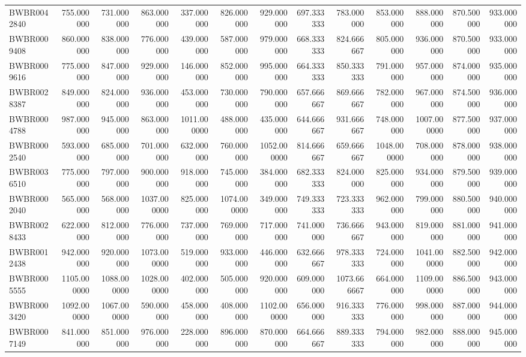 \begin{longtable}{lrrrrrrrrrrrr}
BWBR0042840 & 755.000000 & 731.000000 & 863.000000 & 337.000000 & 826.000000 & 929.000000 & 697.333333 & 783.000000 & 853.000000 & 888.000000 & 870.500000 & 933.000000 \\
BWBR0009408 & 860.000000 & 838.000000 & 776.000000 & 439.000000 & 587.000000 & 979.000000 & 668.333333 & 824.666667 & 805.000000 & 936.000000 & 870.500000 & 933.000000 \\
BWBR0009616 & 775.000000 & 847.000000 & 929.000000 & 146.000000 & 852.000000 & 995.000000 & 664.333333 & 850.333333 & 791.000000 & 957.000000 & 874.000000 & 935.000000 \\
BWBR0028387 & 849.000000 & 824.000000 & 936.000000 & 453.000000 & 730.000000 & 790.000000 & 657.666667 & 869.666667 & 782.000000 & 967.000000 & 874.500000 & 936.000000 \\
BWBR0004788 & 987.000000 & 945.000000 & 863.000000 & 1011.000000 & 488.000000 & 435.000000 & 644.666667 & 931.666667 & 748.000000 & 1007.000000 & 877.500000 & 937.000000 \\
BWBR0002540 & 593.000000 & 685.000000 & 701.000000 & 632.000000 & 760.000000 & 1052.000000 & 814.666667 & 659.666667 & 1048.000000 & 708.000000 & 878.000000 & 938.000000 \\
BWBR0036510 & 775.000000 & 797.000000 & 900.000000 & 918.000000 & 745.000000 & 384.000000 & 682.333333 & 824.000000 & 825.000000 & 934.000000 & 879.500000 & 939.000000 \\
BWBR0002040 & 565.000000 & 568.000000 & 1037.000000 & 825.000000 & 1074.000000 & 349.000000 & 749.333333 & 723.333333 & 962.000000 & 799.000000 & 880.500000 & 940.000000 \\
BWBR0028433 & 622.000000 & 812.000000 & 776.000000 & 737.000000 & 769.000000 & 717.000000 & 741.000000 & 736.666667 & 943.000000 & 819.000000 & 881.000000 & 941.000000 \\
BWBR0012438 & 942.000000 & 920.000000 & 1073.000000 & 519.000000 & 933.000000 & 446.000000 & 632.666667 & 978.333333 & 724.000000 & 1041.000000 & 882.500000 & 942.000000 \\
BWBR0005555 & 1105.000000 & 1088.000000 & 1028.000000 & 402.000000 & 505.000000 & 920.000000 & 609.000000 & 1073.666667 & 664.000000 & 1109.000000 & 886.500000 & 943.000000 \\
BWBR0003420 & 1092.000000 & 1067.000000 & 590.000000 & 458.000000 & 408.000000 & 1102.000000 & 656.000000 & 916.333333 & 776.000000 & 998.000000 & 887.000000 & 944.000000 \\
BWBR0007149 & 841.000000 & 851.000000 & 976.000000 & 228.000000 & 896.000000 & 870.000000 & 664.666667 & 889.333333 & 794.000000 & 982.000000 & 888.000000 & 945.000000 \\

\end{longtable}
